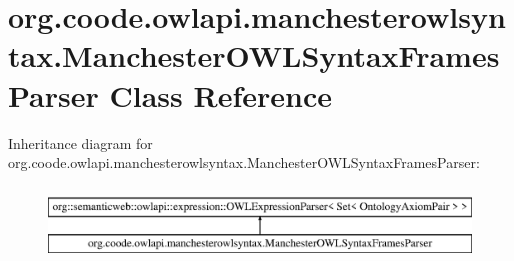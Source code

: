 \hypertarget{classorg_1_1coode_1_1owlapi_1_1manchesterowlsyntax_1_1_manchester_o_w_l_syntax_frames_parser}{\section{org.\-coode.\-owlapi.\-manchesterowlsyntax.\-Manchester\-O\-W\-L\-Syntax\-Frames\-Parser Class Reference}
\label{classorg_1_1coode_1_1owlapi_1_1manchesterowlsyntax_1_1_manchester_o_w_l_syntax_frames_parser}
}
Inheritance diagram for org.\-coode.\-owlapi.\-manchesterowlsyntax.\-Manchester\-O\-W\-L\-Syntax\-Frames\-Parser\-:\begin{figure}[H]
\begin{center}
\leavevmode
\includegraphics[height=2.000000cm]{classorg_1_1coode_1_1owlapi_1_1manchesterowlsyntax_1_1_manchester_o_w_l_syntax_frames_parser}
\end{center}
\end{figure}
